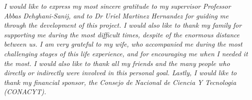 

\begin{acknowledgements}      %

\setlength{\parindent}{17.62482pt}
\setlength{\parskip}{0.0pt plus 1.0pt}

\textit{I would like to express my most sincere gratitude to my supervisor Professor Abbas Dehghani-Sanij, and to Dr Uriel Martinez Hernandez for guiding me through the development of this project. I would also like to thank my family for supporting me during the most difficult times, despite of the enormous distance between us. I am very grateful to my wife, who accompanied me during the most challenging stages of this life experience, and for encouraging me when I needed it the most. I would also like to thank all my friends and the many people who directly or indirectly were involved in this personal goal. Lastly, I would like to thank my financial sponsor, the Consejo de Nacional de Ciencia Y Tecnologia (CONACYT).}

\end{acknowledgements}


